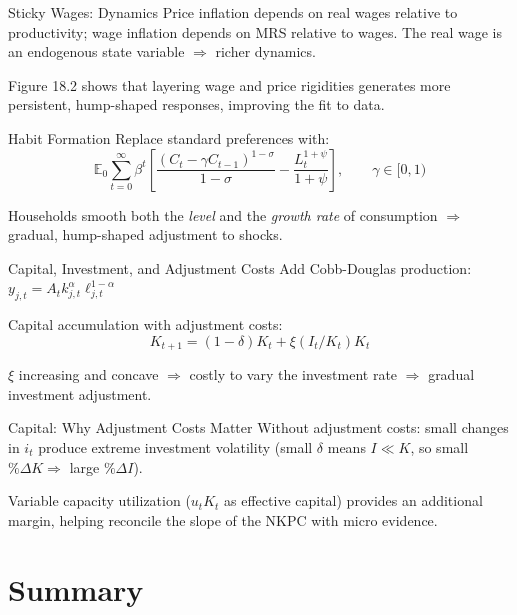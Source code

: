 \documentclass[blue]{beamer}
\newcommand{\E}{\mathbb{E}}
\begin{document}
\begin{frame}{Sticky Wages: Dynamics}
Price inflation depends on real wages relative to productivity; wage inflation depends on MRS relative to wages. The real wage is an endogenous state variable $\Rightarrow$ richer dynamics.

\bigskip
Figure 18.2 shows that layering wage and price rigidities generates more persistent, hump-shaped responses, improving the fit to data.
\end{frame}

\begin{frame}{Habit Formation}
Replace standard preferences with:
\[
\E_0 \sum_{t=0}^{\infty} \beta^t \left[\frac{(C_t - \gamma C_{t-1})^{1-\sigma}}{1-\sigma} - \frac{L_t^{1+\psi}}{1+\psi}\right], \qquad \gamma \in [0,1)
\]

Households smooth both the \emph{level} and the \emph{growth rate} of consumption $\Rightarrow$ gradual, hump-shaped adjustment to shocks.
\end{frame}

\begin{frame}{Capital, Investment, and Adjustment Costs}
Add Cobb-Douglas production: $y_{j,t} = A_t k_{j,t}^\alpha \ell_{j,t}^{1-\alpha}$

\bigskip
Capital accumulation with adjustment costs:
\[
K_{t+1} = (1-\delta)K_t + \xi(I_t/K_t) K_t
\]

$\xi$ increasing and concave $\Rightarrow$ costly to vary the investment rate $\Rightarrow$ gradual investment adjustment.

\bigskip
\end{frame}

\begin{frame}{Capital: Why Adjustment Costs Matter}
Without adjustment costs: small changes in $i_t$ produce extreme investment volatility (small $\delta$ means $I \ll K$, so small $\%\Delta K \Rightarrow$ large $\%\Delta I$).

\bigskip
Variable capacity utilization ($u_t K_t$ as effective capital) provides an additional margin, helping reconcile the slope of the NKPC with micro evidence.
\end{frame}

\section{Summary}
\end{document}
